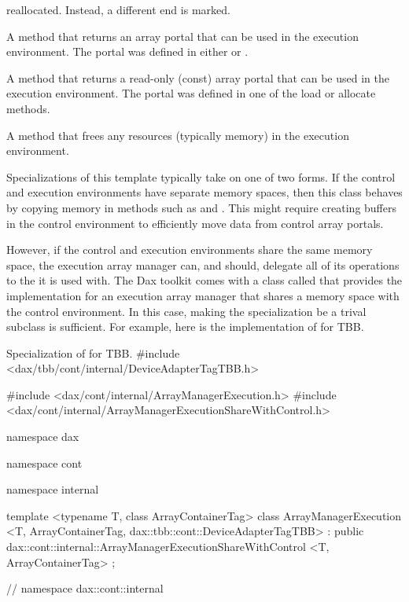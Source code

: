 \begin{description}
  reallocated. Instead, a different end is marked.
\item[\textcode{GetPortal}] A method that returns an array portal
  that can be used in the execution environment. The portal was defined in
  either  or
  .
\item[\textcode{GetPortalConst}] A method that returns a read-only
  (const) array portal that can be used in the execution environment. The
  portal was defined in one of the load or allocate methods.
\item[\textcode{ReleaseResources}] A method that frees any resources
  (typically memory) in the execution environment.
\end{description}

Specializations of this template typically take on one of two forms. If the
control and execution environments have separate memory spaces, then this
class behaves by copying memory in methods such as
 and . This might
require creating buffers in the control environment to efficiently move
data from control array portals.

However, if the control and execution environments share the same memory
space, the execution array manager can, and should, delegate all of its
operations to the  it is used
with. The Dax toolkit comes with a class called
 that provides the
implementation for an execution array manager that shares a memory space
with the control environment. In this case, making the
 specialization be a trival subclass
is sufficient. For example, here is the implementation of
 for TBB.

\begin{daxexample}{Specialization of  for TBB.}
#include <dax/tbb/cont/internal/DeviceAdapterTagTBB.h>

#include <dax/cont/internal/ArrayManagerExecution.h>
#include <dax/cont/internal/ArrayManagerExecutionShareWithControl.h>

namespace dax {
namespace cont {
namespace internal {

template <typename T, class ArrayContainerTag>
class ArrayManagerExecution
    <T, ArrayContainerTag, dax::tbb::cont::DeviceAdapterTagTBB>
    : public dax::cont::internal::ArrayManagerExecutionShareWithControl
        <T, ArrayContainerTag>
{
};

}
}
} // namespace dax::cont::internal
\end{daxexample}

